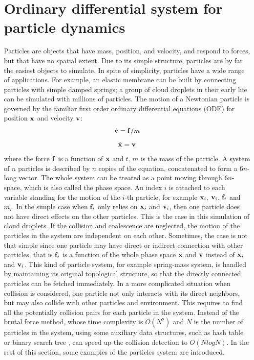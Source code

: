 \section{Ordinary differential system for particle dynamics}
Particles are objects that have mass, position, and velocity, and respond to forces, but that have no spatial extent. Due to its simple structure, particles are by far the easiest objects to simulate. In spite of simplicity, particles have a wide range of applications. For example, an elastic membrane can be built by connecting particles with simple damped springs; a group of cloud droplets in their early life can be simulated with millions of particles. The motion of a Newtonian particle is governed by the familiar first order ordinary differential equations (ODE) for position $\mathbf{x}$ and velocity $\mathbf{v}$:
\begin{equation}
\dot{\mathbf{v}} = \mathbf{f}/m
\label{dv_eqn}
\end{equation}
\begin{equation}
\dot{\mathbf{x}} = \mathbf{v}
\label{dx_eqn}
\end{equation}
where the force $\mathbf{f}$ is a function of $\mathbf{x}$ and $t$, $m$ is the mass of the particle. A system of $n$ particles is described by $n$ copies of the equation, concatenated to form a $6n$-long vector. The whole system can be treated as a point moving through $6n$-space, which is also called the phase space. An index $i$ is attached to each variable standing for the motion of the $i$-th particle, for example $\mathbf{x}_i$, $\mathbf{v_i}$, $\mathbf{f}_i$ and $m_i$. In the simple case when $\mathbf{f}_i$ only relies on $\mathbf{x}_i$ and $\mathbf{v}_i$, then one particle does not have direct effects on the other particles. This is the case in this simulation of cloud droplets. If the collision and coalescence are neglected, the motion of the particles in the system are independent on each other. Sometimes, the case is not that simple since one particle may have direct or indirect connection with other particles, that is $\mathbf{f}_i$ is a function of the whole phase space $\mathbf{x}$ and $\mathbf{v}$ instead of $\mathbf{x}_i$ and $\mathbf{v}_i$. This kind of particle system, for example spring-mass system, is handled by maintaining its original topological structure, so that the directly connected particles can be fetched immediately. In a more complicated situation when collision is considered, one particle not only interacts with its direct neighbors, but may also collide with other particles and environment. This requires to find all the potentially collision pairs for each particle in the system. Instead of the brutal force method, whose time complexity is $O(N^2)$ and $N$ is the number of particles in the system, using some auxiliary data structures, such as hash table \cite{} or binary search tree \cite{}, can speed up the collision detection to $O(NlogN)$. In the rest of this section, some examples of the particles system are introduced.

